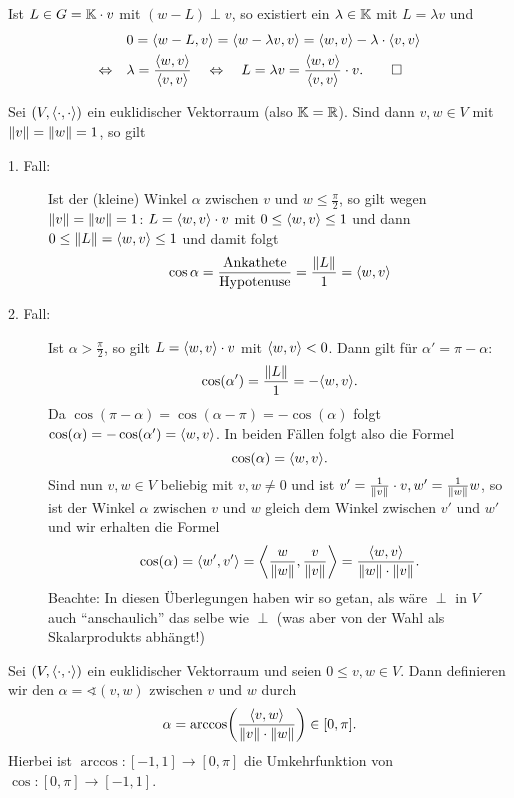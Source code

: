 \begin{beweis}
	Ist $L \in G = \mathbb{K} \cdot v$ mit $(w-L) \perp v$, so existiert ein $\lambda \in \mathbb{K}$ mit $L = \lambda v$ und
	\begin{align*}
		&0 = \left\langle w-L,v\right\rangle = \left\langle w- \lambda v,v\right\rangle = \left\langle w,v\right\rangle - \lambda \cdot \left\langle v,v\right\rangle \\
		\Leftrightarrow \quad &\lambda = \frac{\left\langle w,v\right\rangle}{\left\langle v,v\right\rangle} \quad \Leftrightarrow \quad L = \lambda v = \frac{\left\langle w,v\right\rangle}{\left\langle v,v\right\rangle} \cdot v. \qedhere
	\end{align*}
\end{beweis}

\begin{bemerkung}
	\label{bem:3.14}
	Sei $(V,\left\langle\cdot,\cdot\right\rangle)$ ein euklidischer Vektorraum (also $\mathbb{K}= \mathbb{R}$).
	Sind dann $v,w \in V$ mit $\left\lVert v\right\rVert = \left\lVert w\right\rVert = 1$, so gilt
	\begin{description}
		\item[1. Fall:] Ist der (kleine) Winkel $\alpha$ zwischen $v$ und $w \leq \frac{\pi}{2}$, so gilt wegen $\left\lVert v\right\rVert = \left\lVert w\right\rVert = 1$:
		$L = \left\langle w,v\right\rangle \cdot v$ mit $0 \leq \left\langle w,v\right\rangle \leq 1$ und dann $0 \leq \left\lVert L\right\rVert = \left\langle w,v\right\rangle \leq 1$ und damit folgt 
		\[
			 \cos{\alpha} = \frac{\mathrm{Ankathete}}{\mathrm{Hypotenuse}} = \frac{\left\lVert L\right\rVert}{1} = \left\langle w,v\right\rangle
		\] 
		\item[2. Fall:] Ist $\alpha > \frac{\pi}{2}$, so gilt $L = \left\langle w,v\right\rangle \cdot v$ mit $\left\langle w,v\right\rangle < 0$.
		Dann gilt für $\alpha' = \pi - \alpha$: 
		\[
			\cos(\alpha') = \frac{\no{L}}{1} = -\sk{w,v}.
		\]
		Da $\cos(\pi-\alpha) = \cos(\alpha - \pi) = -\cos(\alpha)$ folgt $\cos(\alpha) = - \cos(\alpha') = \left\langle w,v\right\rangle$.
		In beiden Fällen folgt also die Formel
		\[
			\cos(\alpha) = \sk{w,v}.
		\]
		Sind nun $v,w \in V$ beliebig mit $v,w \neq 0$ und ist $v' = \frac{1}{\left\lVert v\right\rVert} \cdot v, w' = \frac{1}{\left\lVert w\right\rVert} w$, so ist der Winkel $\alpha$ zwischen $v$ und $w$ gleich dem Winkel zwischen $v'$ und $w'$ und wir erhalten die Formel
		\[
			\cos(\alpha) = \left\langle w',v'\right\rangle = \left\langle\frac{w}{\left\lVert w\right\rVert},\frac{v}{\left\lVert v\right\rVert}\right\rangle = \frac{\left\langle w,v\right\rangle}{\left\lVert w\right\rVert \cdot \left\lVert v\right\rVert}.
		\]
		Beachte: In diesen Überlegungen haben wir so getan, als wäre $\perp$ in $V$ auch \enquote{anschaulich} das selbe wie $\perp$ (was aber von der Wahl als Skalarprodukts abhängt!)
	\end{description}
\end{bemerkung}

\begin{definition}[Winkel]
	\label{def:3.15}
	Sei $(V,\left\langle\cdot,\cdot\right\rangle)$ ein euklidischer Vektorraum und seien $0 \leq v,w \in V$.
	Dann definieren wir den  $\alpha = \sphericalangle(v,w)$ zwischen $v$ und $w$ durch
	\[
		\alpha = \arccos \enb{\frac{\sk{v,w}}{\no{v} \cdot \no{w}}} \in [0,\pi].
	\]
	Hierbei ist $\arccos\colon [-1,1] \rightarrow [0,\pi]$ die Umkehrfunktion von $\cos \colon [0,\pi] \rightarrow [-1,1]$.
\end{definition}

